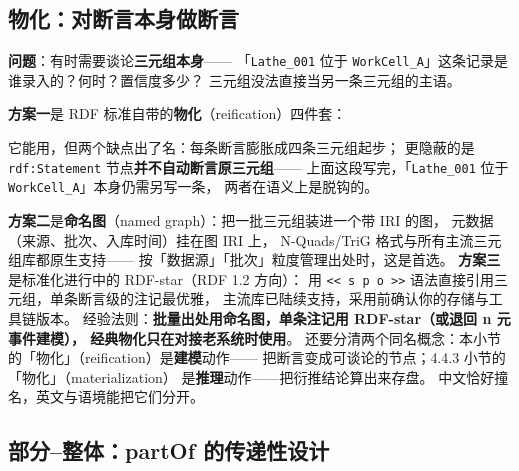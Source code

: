 \subsection{物化：对断言本身做断言}

\textbf{问题}：有时需要谈论\textbf{三元组本身}——
「\texttt{Lathe\_001} 位于 \texttt{WorkCell\_A}」这条记录是谁录入的？何时？置信度多少？
三元组没法直接当另一条三元组的主语。

\textbf{方案一}是 RDF 标准自带的\textbf{物化}（reification）四件套：

\begin{codebox}
\codeline{\textcolor{cmtgray}{\#\ 把一条三元组「实体化」成\ rdf:Statement\ 节点，再挂元数据}}
\end{codebox}

它能用，但两个缺点出了名：每条断言膨胀成四条三元组起步；
更隐蔽的是 \texttt{rdf:Statement} 节点\textbf{并不自动断言原三元组}——
上面这段写完，「\texttt{Lathe\_001} 位于 \texttt{WorkCell\_A}」本身仍需另写一条，
两者在语义上是脱钩的。

\textbf{方案二}是\textbf{命名图}（named graph）：把一批三元组装进一个带 IRI 的图，
元数据（来源、批次、入库时间）挂在图 IRI 上，
N-Quads/TriG 格式与所有主流三元组库都原生支持——
按「数据源」「批次」粒度管理出处时，这是首选。
\textbf{方案三}是标准化进行中的 RDF-star（RDF 1.2 方向）：
用 \texttt{<<\ s\ p\ o\ >>} 语法直接引用三元组，单条断言级的注记最优雅，
主流库已陆续支持，采用前确认你的存储与工具链版本。
经验法则：\textbf{批量出处用命名图，单条注记用 RDF-star（或退回 n 元事件建模），
经典物化只在对接老系统时使用}。
还要分清两个同名概念：本小节的「物化」（reification）是\textbf{建模}动作——
把断言变成可谈论的节点；4.4.3 小节的「物化」（materialization）
是\textbf{推理}动作——把衍推结论算出来存盘。
中文恰好撞名，英文与语境能把它们分开。

\subsection{部分--整体：partOf 的传递性设计}


